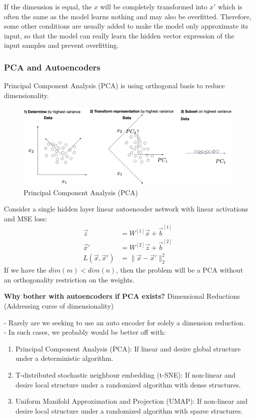 \documentclass[11pt,a4paper]{article}
\begin{document}
If the dimension is equal, the $x$ will be completely transformed into $x'$ which is often the same as the model learns nothing and may also be overfitted. Therefore, some other conditions are usually added to make the model only approximate its input, so that the model can really learn the hidden vector expression of the input samples and prevent overfitting.

\subsubsection{PCA and Autoencoders}

Principal Component Analysis (PCA) is using orthogonal basis to reduce dimensionality.
\begin{center}\begin{figure}[htbp]
    \centering
    \includegraphics[scale=0.2]{PCA.png}
    \caption{Principal Component Analysis (PCA)}
    \label{}
\end{figure}\end{center}
Consider a single hidden layer linear autoencoder network with linear activations and MSE loss:
\begin{equation}
    \begin{aligned}
        \vec{z}&=W^{[1]}\vec{x}+\vec{b}^{[1]}\\
        \vec{x}'&=W^{[2]}\vec{z}+\vec{b}^{[2]}\\
        L(\vec{x},\vec{x}')&=\|\vec{x}-\vec{x}'\|^2_2
    \end{aligned}
    \nonumber
\end{equation}
If we have the ${dim}(m) < {dim}(n)$, then the problem will be a PCA without an orthogonality restriction on the weights.

\textbf{Why bother with autoencoders if PCA exists?} Dimensional Reductions (Addressing curse of dimensionality)

- Rarely are we seeking to use an auto encoder for solely a dimension reduction.\\
- In such cases, we probably would be better off with:
\begin{enumerate}[$\bullet$]
    \item Principal Component Analysis (PCA): If linear and desire global structure under a deterministic algorithm.
    \item T-distributed stochastic neighbour embedding (t-SNE): If non-linear and desire local structure under a randomized algorithm with dense structures.
    \item Uniform Manifold Approximation and Projection (UMAP): If non-linear and desire local structure under a randomized algorithm with sparse structures.
\end{enumerate}
\end{document}
